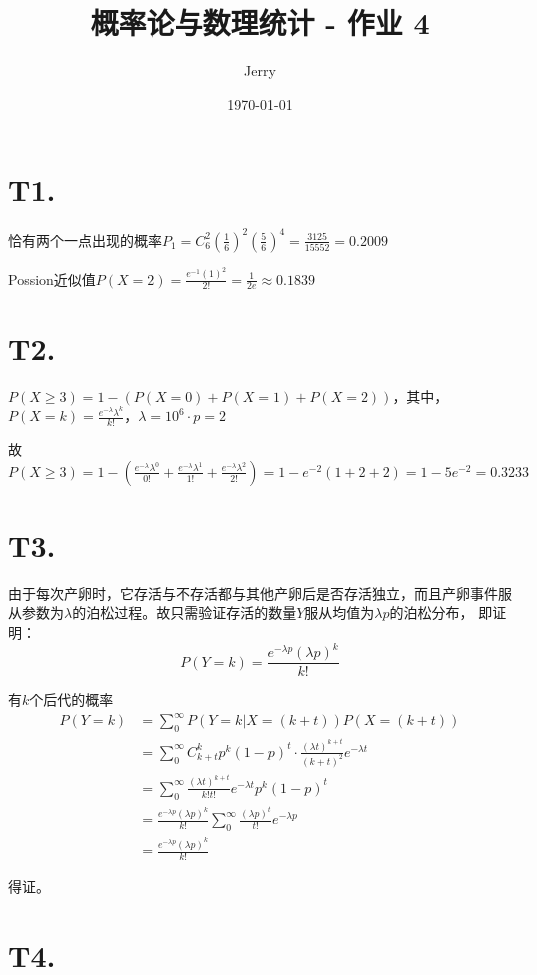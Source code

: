 \documentclass{article}
\title{\bf\huge 概率论与数理统计 - 作业 4}
\author{Jerry}
\date{\today}
\newcommand\f[2]{\frac{#1}{#2}}
\begin{document}
\maketitle

\section*{T1. }

恰有两个一点出现的概率$P_1=C_6^2(\f{1}{6})^2(\f{5}{6})^4=\f{3125}{15552}=0.2009$

Possion近似值$P(X=2)=\f{e^{-1}(1)^2}{2!}=\f{1}{2e}\approx0.1839$

\section*{T2. }

$P(X\geq3)=1-(P(X=0)+P(X=1)+P(X=2))$，其中，$P(X=k)=\f{e^{-\lambda}\lambda^k}{k!}$，$\lambda=10^6\cdot p=2$

故$P(X\geq3)=1-(\f{e^{-\lambda}\lambda^0}{0!}+\f{e^{-\lambda}\lambda^1}{1!}+\f{e^{-\lambda}\lambda^2}{2!})=1-e^{-2}(1+2+2)=1-5e^{-2}=0.3233$

\section*{T3. }

由于每次产卵时，它存活与不存活都与其他产卵后是否存活独立，而且产卵事件服从参数为$\lambda$的泊松过程。故只需验证存活的数量$Y$服从均值为$\lambda p$的泊松分布，
即证明：$$P(Y=k)=\f{e^{-\lambda p}(\lambda p)^k}{k!}$$

有$k$个后代的概率
\begin{equation}
    \begin{aligned}
        P(Y=k)
        & =\sum_{0}^{\infty}P(Y=k|X=(k+t))P(X=(k+t))\\
        & =\sum_{0}^{\infty}C_{k+t}^kp^k(1-p)^t\cdot\f{(\lambda t)^{k+t}}{(k+t)^2}e^{-\lambda t}\\
        & =\sum_{0}^{\infty}\f{(\lambda t)^{k+t}}{k!t!}e^{-\lambda t}p^k(1-p)^t\\
        & =\f{e^{-\lambda p}(\lambda p)^k}{k!}\sum_{0}^{\infty}\f{(\lambda p)^t}{t!}e^{-\lambda p}\\
        & =\f{e^{-\lambda p}(\lambda p)^k}{k!}
    \end{aligned}
\end{equation}

得证。

\section*{T4. }
\end{document}
